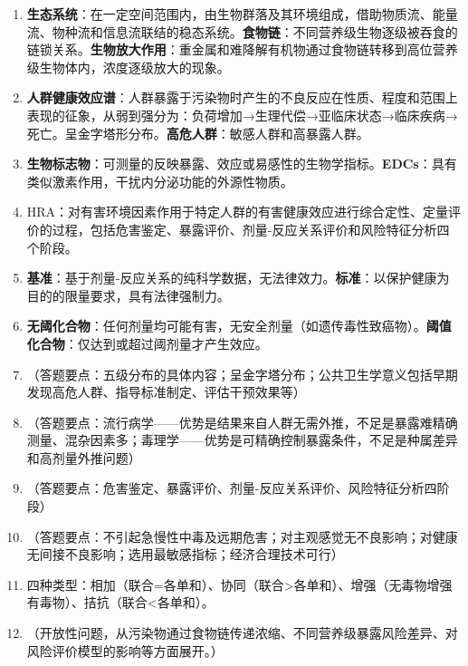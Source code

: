 \begin{enumerate}[leftmargin=*, itemsep=5pt]
    \item \textbf{生态系统}：在一定空间范围内，由生物群落及其环境组成，借助物质流、能量流、物种流和信息流联结的稳态系统。\textbf{食物链}：不同营养级生物逐级被吞食的链锁关系。\textbf{生物放大作用}：重金属和难降解有机物通过食物链转移到高位营养级生物体内，浓度逐级放大的现象。
    \item \textbf{人群健康效应谱}：人群暴露于污染物时产生的不良反应在性质、程度和范围上表现的征象，从弱到强分为：负荷增加→生理代偿→亚临床状态→临床疾病→死亡。呈金字塔形分布。\textbf{高危人群}：敏感人群和高暴露人群。
    \item \textbf{生物标志物}：可测量的反映暴露、效应或易感性的生物学指标。\textbf{EDCs}：具有类似激素作用，干扰内分泌功能的外源性物质。
    \item HRA：对有害环境因素作用于特定人群的有害健康效应进行综合定性、定量评价的过程，包括危害鉴定、暴露评价、剂量-反应关系评价和风险特征分析四个阶段。
    \item \textbf{基准}：基于剂量-反应关系的纯科学数据，无法律效力。\textbf{标准}：以保护健康为目的的限量要求，具有法律强制力。
    \item \textbf{无阈化合物}：任何剂量均可能有害，无安全剂量（如遗传毒性致癌物）。\textbf{阈值化合物}：仅达到或超过阈剂量才产生效应。
    \item （答题要点：五级分布的具体内容；呈金字塔分布；公共卫生学意义包括早期发现高危人群、指导标准制定、评估干预效果等）
    \item （答题要点：流行病学——优势是结果来自人群无需外推，不足是暴露难精确测量、混杂因素多；毒理学——优势是可精确控制暴露条件，不足是种属差异和高剂量外推问题）
    \item （答题要点：危害鉴定、暴露评价、剂量-反应关系评价、风险特征分析四阶段）
    \item （答题要点：不引起急慢性中毒及远期危害；对主观感觉无不良影响；对健康无间接不良影响；选用最敏感指标；经济合理技术可行）
    \item 四种类型：相加（联合=各单和）、协同（联合>各单和）、增强（无毒物增强有毒物）、拮抗（联合<各单和）。
    \item （开放性问题，从污染物通过食物链传递浓缩、不同营养级暴露风险差异、对风险评价模型的影响等方面展开。）
\end{enumerate}

\newpage

\newpage
